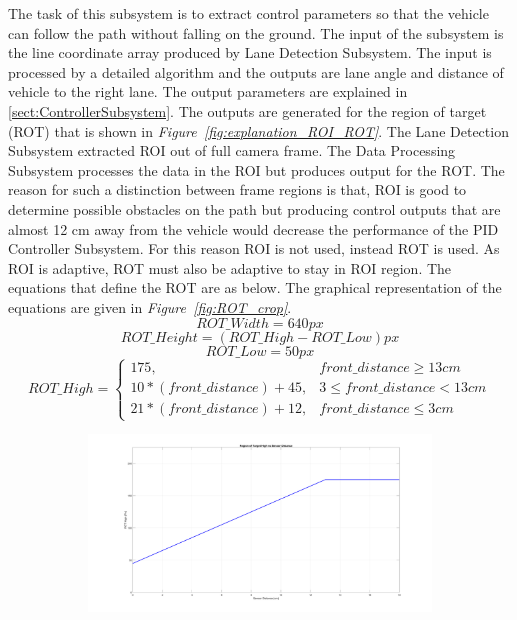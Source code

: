 \documentclass[a4paper,12pt]{article}
\begin{document}
\begin{enumerate}[A.]
The task of this subsystem is to extract control parameters so that the vehicle can follow the path without falling on the ground. The input of the subsystem is the line coordinate array produced by Lane Detection Subsystem. The input is processed by a detailed algorithm and the outputs are lane angle and distance of vehicle to the right lane. The output parameters are explained in \ref{sect:ControllerSubsystem}. The outputs are generated for the region of target (ROT) that is shown in \textit{Figure~\ref{fig:explanation_ROI_ROT}}. The Lane Detection Subsystem extracted ROI out of full camera frame. The Data Processing Subsystem processes the data in the ROI but produces output for the ROT. The reason for such a distinction between frame regions is that, ROI is good to determine possible obstacles on the path but producing control outputs that are almost 12 cm away from the vehicle would decrease the performance of the PID Controller Subsystem. For this reason ROI is not used, instead ROT is used. As ROI is adaptive, ROT must also be adaptive to stay in ROI region. The equations that define the ROT are as below. The graphical representation of the equations are given in \textit{Figure~\ref{fig:ROT_crop}}.
\begin{equation}
ROT\_Width = 640 px
\end{equation}
\begin{equation}
ROT\_Height = (ROT\_High - ROT\_Low) px
\end{equation}
\begin{equation}
ROT\_Low = 50 px
\end{equation}
\begin{equation}
ROT\_High =
\begin{cases}
175, & front\_distance \geq 13 cm \\
10*(front\_distance) + 45, &3\leq front\_distance <  13 cm \\
21*(front\_distance) + 12, & front\_distance \leq 3 cm
\end{cases}
\end{equation}
\begin{figure}[t!]
	
	\setlength{\unitlength}{\textwidth} 
	
	\centering
	
	\begin{subfigure}{.46\textwidth}
		
		\centering
		
		\includegraphics[width=0.44\unitlength]{images/ROT_ROI/ROT_HIGH}
		

\end{subfigure}
\end{figure}
\end{enumerate}
\end{document}
